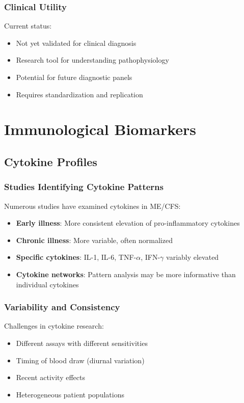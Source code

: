 \subsubsection{Clinical Utility}
Current status:
\begin{itemize}
    \item Not yet validated for clinical diagnosis
    \item Research tool for understanding pathophysiology
    \item Potential for future diagnostic panels
    \item Requires standardization and replication
\end{itemize}

\section{Immunological Biomarkers}
\label{sec:immunological-biomarkers}

\subsection{Cytokine Profiles}

\subsubsection{Studies Identifying Cytokine Patterns}
Numerous studies have examined cytokines in ME/CFS:
\begin{itemize}
    \item \textbf{Early illness}: More consistent elevation of pro-inflammatory cytokines
    \item \textbf{Chronic illness}: More variable, often normalized
    \item \textbf{Specific cytokines}: IL-1, IL-6, TNF-$\alpha$, IFN-$\gamma$ variably elevated
    \item \textbf{Cytokine networks}: Pattern analysis may be more informative than individual cytokines
\end{itemize}

\subsubsection{Variability and Consistency}
Challenges in cytokine research:
\begin{itemize}
    \item Different assays with different sensitivities
    \item Timing of blood draw (diurnal variation)
    \item Recent activity effects
    \item Heterogeneous patient populations
\end{itemize}

